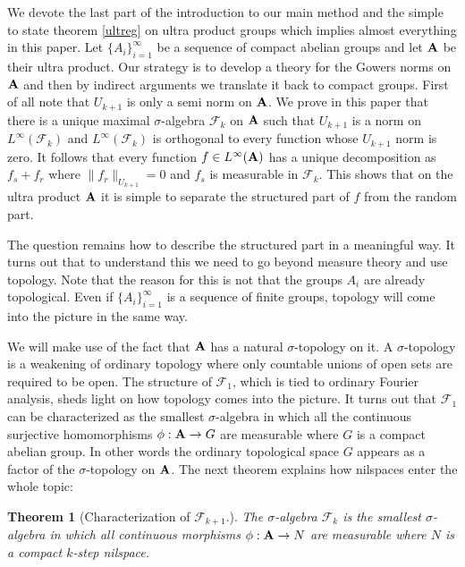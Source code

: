 \documentclass [11pt] {article}
\newtheorem{theorem}{Theorem}
\def\bA{{\bf A}}
\begin{document}
We devote the last part of the introduction to our main method and the simple to state theorem \ref{ultreg} on ultra product groups which implies almost everything in this paper.
Let $\{A_i\}_{i=1}^\infty$ be a sequence of compact abelian groups and let $\bA$ be their ultra product.
Our strategy is to develop a theory for the Gowers norms on $\bA$ and then by indirect arguments we translate it back to compact groups.
First of all note that $U_{k+1}$ is only a semi norm on $\bA$. We prove in this paper that there is a unique maximal $\sigma$-algebra $\mathcal{F}_k$ on $\bA$ such that $U_{k+1}$ is a norm on $L^\infty(\mathcal{F}_k)$ and $L^\infty(\mathcal{F}_k)$ is orthogonal to every function whose $U_{k+1}$ norm is zero.
It follows that every function $f\in L^\infty(\bA)$ has a unique decomposition as $f_s+f_r$ where $\|f_r\|_{U_{k+1}}=0$ and $f_s$ is measurable in $\mathcal{F}_k$. 
This shows that on the ultra product $\bA$ it is simple to separate the structured part of $f$ from the random part. 

The question remains how to describe the structured part in a meaningful way.
It turns out that to understand this we need to go beyond measure theory and use topology. 
Note that the reason for this is not that the groups $A_i$ are already topological. Even if $\{A_i\}_{i=1}^\infty$ is a sequence of finite groups, topology will come into the picture in the same way.  

We will make use of the fact that $\bA$ has a natural $\sigma$-topology on it. A $\sigma$-topology is a weakening of ordinary topology where only countable unions of open sets are required to be open.
The structure of $\mathcal{F}_1$, which is tied to ordinary Fourier analysis, sheds light on how topology comes into the picture. It turns out that $\mathcal{F}_1$ can be characterized as the smallest $\sigma$-algebra in which all the continuous surjective homomorphisms $\phi:\bA\rightarrow G$ are measurable where $G$ is a compact abelian group.
In other words the ordinary topological space $G$ appears as a factor of the $\sigma$-topology on $\bA$.
The next theorem explains how nilspaces enter the whole topic:

\begin{theorem}[Characterization of $\mathcal{F}_{k+1}$.] The $\sigma$-algebra $\mathcal{F}_k$ is the smallest $\sigma$-algebra in which all continuous morphisms $\phi:\bA\rightarrow N$ are measurable where $N$ is a compact $k$-step nilspace.
\end{theorem}
\end{document}
